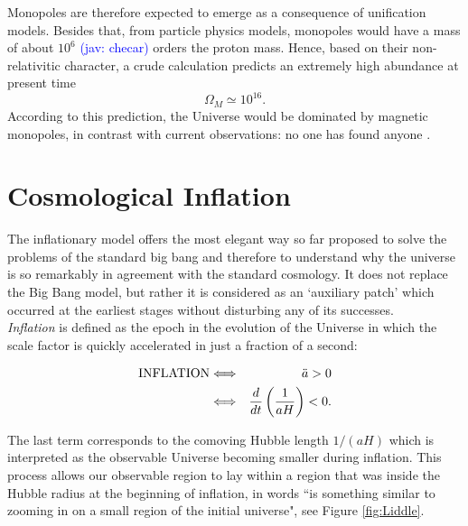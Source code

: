\documentclass{rmaa}
\def\bea{\begin{eqnarray}}
\def\eea{\end{eqnarray}}
\newcommand{\jav}[1]{\textcolor{blue}{(jav: #1)}}
\begin{document}
\noindent
Monopoles are therefore expected to emerge as a consequence of unification models. 
Besides that, from particle physics models, monopoles would have a mass of about $10^6$ \jav{checar}
orders the proton mass. Hence, based on their non-relativitic character, 
a crude calculation predicts an extremely high abundance at present time \citep{Coles}
$$
\Omega_M \simeq 10^{16}.
$$
%
According to this prediction, the Universe would be dominated by magnetic monopoles,
in contrast with current observations: no one has found anyone \citep{Ambrosio02}. 
\\


\section{Cosmological Inflation}
\vskip 6pt

The inflationary model offers the most elegant way so far proposed to solve the problems
of the standard big bang and therefore to understand why the universe is so remarkably in agreement 
with the standard cosmology. It does not replace the Big Bang model, but rather it is considered 
as an `auxiliary patch' which occurred at the earliest stages without disturbing any of its successes.
\\

\textit{Inflation} is defined as the epoch in the evolution of the Universe in which the scale factor 
is quickly accelerated in just a fraction of a second:

\bea \label{eq:inflation}
{\rm INFLATION} &\Longleftrightarrow&~~\ddot a>0 \\
&\Longleftrightarrow& \frac{d}{dt}\left( \frac{{1}}{aH}\right)<0. \label{eq:inflation2}
\eea

\noindent
The last term corresponds to the comoving Hubble length 
$1/(aH)$ which is interpreted as the observable 
Universe becoming smaller during inflation. This process allows our observable
region to lay within a region that was inside the Hubble radius at the beginning of inflation, 
in \citet{Liddle2} words ``is something
similar to zooming in on a small region of the initial universe", see
Figure \ref{fig:Liddle}.
\\
\end{document}

